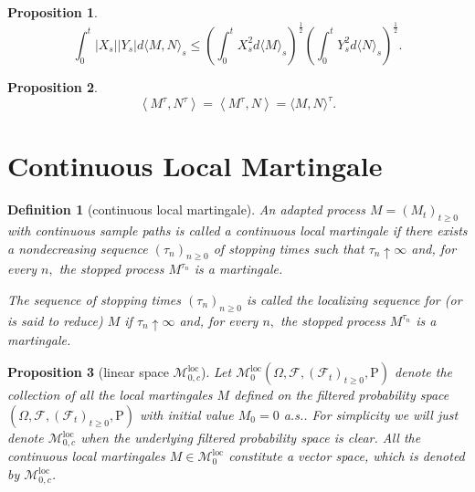 \documentclass{report}
\newtheorem{definition}{Definition}[section]
\newtheorem{proposition}{Proposition}[section]
\theoremstyle{nonumberplain}
\begin{document}
\begin{proposition}
\[
\int_{0}^{t}\left|X_{s}\right|\left|Y_{s}\right| d\langle M, N\rangle_{s} \leq\left(\int_{0}^{t} X_{s}^{2} d\langle M\rangle_{s}\right)^{\frac{1}{2}}\left(\int_{0}^{t} Y_{s}^{2} d\langle N\rangle_{s}\right)^{\frac{1}{2}}.
\]
\end{proposition}

\begin{proposition}
	\[
	\left\langle M^{\tau}, N^{\tau}\right\rangle=\left\langle M^{\tau}, N\right\rangle=\langle M, N\rangle^{\tau}.
	\]
\end{proposition}

\section{Continuous Local Martingale}
\begin{definition}[continuous local martingale]
	An adapted process $M=\left(M_{t}\right)_{t \geq 0}$ with continuous sample paths is called a \emph{continuous local martingale} if there exists a nondecreasing sequence $\left(\tau_{n}\right)_{n \geq 0}$ of stopping times such that $\tau_{n} \uparrow \infty$ and, for every $n,$ the stopped process $M^{\tau_{n}}$ is a martingale.
	
	The sequence of stopping times $\left(\tau_{n}\right)_{n\ge0}$ is called the \emph{localizing sequence}
	for (or is said to reduce) $M$ if $\tau_{n} \uparrow \infty$ and, for every $n,$ the stopped process $M^{\tau_{n}}$ is a martingale.
\end{definition}


\begin{proposition}[linear space $\mathscr{M}^{\mathrm{loc}}_{0,c}$]
	Let $\mathscr{M}_0^{\mathrm{loc}}(\Omega,\mathcal{F},(\mathcal{F}_{t})_{t\ge0},\mathrm{P})$ denote the collection of all the local martingales $M$ defined on the filtered probability space $(\Omega,\mathcal{F},(\mathcal{F}_{t})_{t\ge0},\mathrm{P})$ with initial value $M_0=0$ a.s.. For simplicity we will just denote $\mathscr{M}^{\mathrm{loc}}_{0,c}$ when the underlying filtered probability space is clear. All the continuous local martingales $M\in\mathscr{M}^{\mathrm{loc}}_{0}$ constitute a vector space, which is denoted by $\mathscr{M}^{\mathrm{loc}}_{0,c}$.
\end{proposition}
\end{document}
